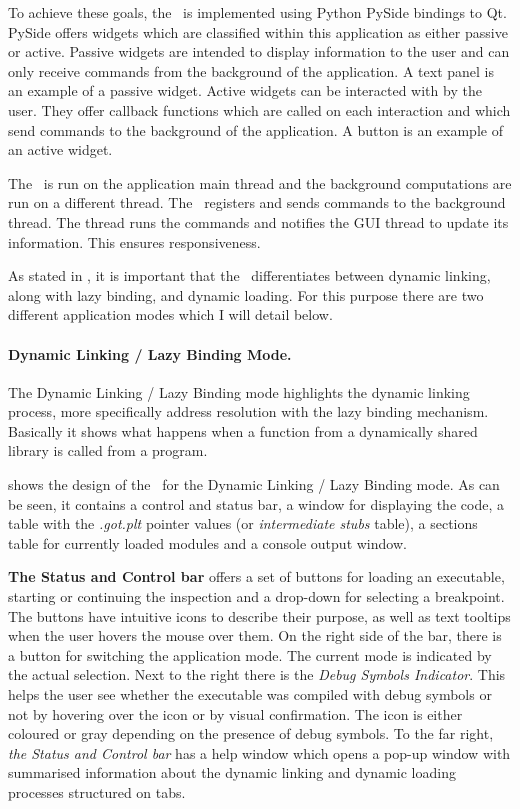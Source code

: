To achieve these goals, the \gui\ is implemented using Python PySide bindings to Qt. PySide offers widgets which are classified within this application as either passive or active. Passive widgets are intended to display information to the user and can only receive commands from the background of the application. A text panel is an example of a passive widget. Active widgets can be interacted with by the user. They offer callback functions which are called on each interaction and which send commands to the background of the application. A button is an example of an active widget.

The \gui\ is run on the application main thread and the background computations are run on a different thread. The \gui\ registers and sends commands to the background thread. The thread runs the commands and notifies the GUI thread to update its information. This ensures responsiveness.

As stated in , it is important that the \gui\ differentiates between dynamic linking, along with lazy binding, and dynamic loading. For this purpose there are two different application modes which I will detail below.

\paragraph{Dynamic Linking / Lazy Binding Mode.}

The Dynamic Linking / Lazy Binding mode highlights the dynamic linking process, more specifically address resolution with the lazy binding mechanism. Basically it shows what happens when a function from a dynamically shared library is called from a program.

 shows the design of the \gui\ for the Dynamic Linking / Lazy Binding mode. As can be seen, it contains a control and status bar, a window for displaying the code, a table with the \textit{.got.plt} pointer values (or \textit{intermediate stubs} table), a sections table for currently loaded modules and a console output window.

\textbf{The Status and Control bar} offers a set of buttons for loading an executable, starting or continuing the inspection and a drop-down for selecting a breakpoint. The buttons have intuitive icons to describe their purpose, as well as text tooltips when the user hovers the mouse over them. On the right side of the bar, there is a button for switching the application mode. The current mode is indicated by the actual selection. Next to the right there is the \textit{Debug Symbols Indicator}. This helps the user see whether the executable was compiled with debug symbols or not by hovering over the icon or by visual confirmation. The icon is either coloured or gray depending on the presence of debug symbols. To the far right, \textit{the Status and Control bar} has a help window which opens a pop-up window with summarised information about the dynamic linking and dynamic loading processes structured on tabs.

